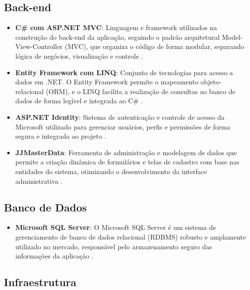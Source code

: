 \documentclass[
	12pt,				%
	openany,			%
	twoside,			%
	a4paper,			%
	english,			%
	brazil				%
	]{abntex2}
\begin{document}
\subsection{Back-end}

\begin{itemize}

  \item \textbf{C\# com ASP.NET MVC}: Linguagem e framework utilizados na construção do back-end da aplicação, seguindo o padrão arquitetural Model-View-Controller (MVC), que organiza o código de forma modular, separando lógica de negócios, visualização e controle \cite{AspNet2025}.

  \item \textbf{Entity Framework com LINQ}: Conjunto de tecnologias para acesso a dados em .NET. O Entity Framework permite o mapeamento objeto-relacional (ORM), e o LINQ facilita a realização de consultas ao banco de dados de forma legível e integrada ao C\# \cite{EfCore}.

  \item \textbf{ASP.NET Identity}: Sistema de autenticação e controle de acesso da Microsoft utilizado para gerenciar usuários, perfis e permissões de forma segura e integrada ao projeto \cite{Identity}.

  \item \textbf{JJMasterData}: Ferramenta de administração e modelagem de dados que permite a criação dinâmica de formulários e telas de cadastro com base nas entidades do sistema, otimizando o desenvolvimento da interface administrativa \cite{JJMasterdata}.

\end{itemize}

\subsection{Banco de Dados}

\begin{itemize}
    \item \textbf{Microsoft SQL Server}: O Microsoft SQL Server é um sistema de gerenciamento de banco de dados relacional (RDBMS) robusto e amplamente utilizado no mercado, responsável pelo armazenamento seguro das informações da aplicação \cite{SqlServer2025}.


\end{itemize}

\subsection{Infraestrutura}
\end{document}
